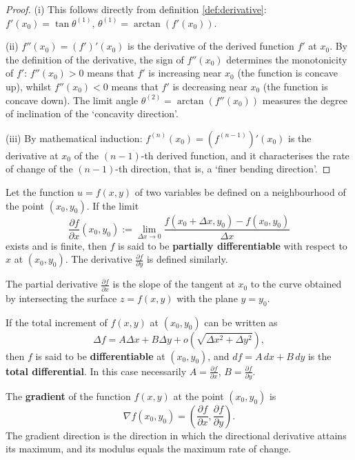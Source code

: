 \begin{proof}
(i) This follows directly from definition \ref{def:derivative}: $f'(x_0) = \tan\theta^{(1)}$, $\theta^{(1)} = \arctan(f'(x_0))$.

(ii) $f''(x_0) = (f')'(x_0)$ is the derivative of the derived function $f'$ at $x_0$. By the definition of the derivative, the sign of $f''(x_0)$ determines the monotonicity of $f'$: $f''(x_0) > 0$ means that $f'$ is increasing near $x_0$ (the function is concave up), whilst $f''(x_0) < 0$ means that $f'$ is decreasing near $x_0$ (the function is concave down). The limit angle $\theta^{(2)} = \arctan(f''(x_0))$ measures the degree of inclination of the `concavity direction'.

(iii) By mathematical induction: $f^{(n)}(x_0) = (f^{(n-1)})'(x_0)$ is the derivative at $x_0$ of the $(n-1)$-th derived function, and it characterises the rate of change of the $(n-1)$-th direction, that is, a `finer bending direction'.
\end{proof}

\begin{definition}\label{def:partial_derivative}
Let the function $u = f(x, y)$ of two variables be defined on a neighbourhood of the point $(x_0, y_0)$. If the limit
\[\frac{\partial f}{\partial x}(x_0, y_0) := \lim_{\Delta x \to 0} \frac{f(x_0 + \Delta x, y_0) - f(x_0, y_0)}{\Delta x}\]
exists and is finite, then $f$ is said to be \textbf{partially differentiable} with respect to $x$ at $(x_0, y_0)$. The derivative $\frac{\partial f}{\partial y}$ is defined similarly.

The partial derivative $\frac{\partial f}{\partial x}$ is the slope of the tangent at $x_0$ to the curve obtained by intersecting the surface $z = f(x,y)$ with the plane $y = y_0$.
\end{definition}

\begin{definition}\label{def:total_differential}
If the total increment of $f(x, y)$ at $(x_0, y_0)$ can be written as
\[\Delta f = A\Delta x + B\Delta y + o\!\left(\sqrt{\Delta x^2 + \Delta y^2}\right),\]
then $f$ is said to be \textbf{differentiable} at $(x_0, y_0)$, and $df = A\,dx + B\,dy$ is the \textbf{total differential}. In this case necessarily $A = \frac{\partial f}{\partial x}$, $B = \frac{\partial f}{\partial y}$.
\end{definition}

\begin{definition}\label{def:gradient_direction}
The \textbf{gradient} of the function $f(x, y)$ at the point $(x_0, y_0)$ is
\[\nabla f(x_0, y_0) = \left( \frac{\partial f}{\partial x}, \frac{\partial f}{\partial y} \right).\]
The gradient direction is the direction in which the directional derivative attains its maximum, and its modulus equals the maximum rate of change.
\end{definition}


